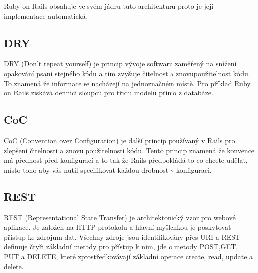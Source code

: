Ruby on Rails obsahuje ve svém jádru tuto architekturu proto je její implementace automatická.

\subsection{DRY}
DRY (Don’t repeat yourself) je princip vývoje softwaru zaměřený na snížení opakování psaní stejného kódu a tím zvyšuje čitelnost a znovupoužitelnost kódu. To znamená že informace se nacházejí na jednoznačném místě. Pro příklad Ruby on Rails získává definici sloupců pro třídu modelu přímo z databáze.  

\subsection{CoC}
CoC (Convention over Configuration) je další princip používaný v Rails pro zlepšení čitelnosti a znovu použitelnosti kódu. Tento princip znamená že konvence má přednost před konfigurací a to tak že Rails předpokládá to co chcete udělat, místo toho aby vás nutil specifikovat každou drobnost v konfiguraci. 

\subsection{REST}
REST (Representational State Transfer) je architektonický vzor pro webové aplikace. Je založen na HTTP protokolu a hlavní myšlenkou je poskytovat přístup ke zdrojům dat. Všechny zdroje jsou identifikovány přes URI a REST definuje čtyři základní metody pro přístup k nim, jde o metody POST,GET, PUT a DELETE, které zprostředkovávají základní operace create, read, update a delete.
